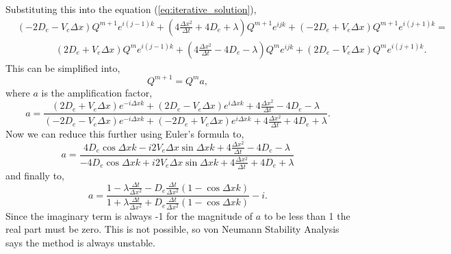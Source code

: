 \documentclass[11pt, letterpaper]{article}
\begin{document}
Substituting this into the equation (\ref{eq:iterative_solution}),
\[
    \begin{split}
        &(-2D_e - V_e\Delta x)Q^{m + 1}e^{i(j - 1)k} + \left(4\frac{\Delta x^2}{\Delta t} + 4D_e + \lambda\right)Q^{m + 1}e^{ijk} + (-2D_e + V_e \Delta x) Q^{m + 1}e^{i(j + 1)k} = \\
        &\qquad\qquad (2D_e + V_e\Delta x)Q^me^{i(j - 1)k} + \left(4\frac{\Delta x^2}{\Delta t} - 4D_e - \lambda\right)Q^me^{ijk} + (2D_e - V_e \Delta x) Q^me^{i(j + 1)k}.
    \end{split}
\]
This can be simplified into,
\[
    Q^{m + 1} = Q^m a,
\]
where $a$ is the amplification factor,
\[
    a = \frac{(2D_e + V_e\Delta x)e^{-i\Delta xk} + (2D_e - V_e\Delta x)e^{i\Delta xk} + 4\frac{\Delta x^2}{\Delta t} - 4D_e - \lambda}
    {(-2D_e - V_e\Delta x)e^{-i\Delta xk} + (-2D_e + V_e\Delta x)e^{i\Delta xk} + 4\frac{\Delta x^2}{\Delta t} + 4D_e + \lambda}.
\]
Now we can reduce this further using Euler's formula to,
\[
    a = \frac{4D_e\cos\Delta xk - i2V_e\Delta x\sin \Delta x k + 4\frac{\Delta x^2}{\Delta t} - 4D_e - \lambda}
    {-4D_e\cos\Delta xk + i2V_e\Delta x\sin \Delta x k + 4\frac{\Delta x^2}{\Delta t} + 4D_e + \lambda}
\]
and finally to,
\[
    a = \frac{1 - \lambda\frac{\Delta t}{\Delta x^2} - D_e\frac{\Delta t}{\Delta x^2} (1 - \cos\Delta x k)}
    {1 + \lambda\frac{\Delta t}{\Delta x^2} + D_e\frac{\Delta t}{\Delta x^2} (1 - \cos\Delta x k)} - i.
\]
Since the imaginary term is always -1 for the magnitude of $a$ to be less than 1 the real part must be zero.
This is not possible, so von Neumann Stability Analysis says the method is always unstable.
\end{document}
